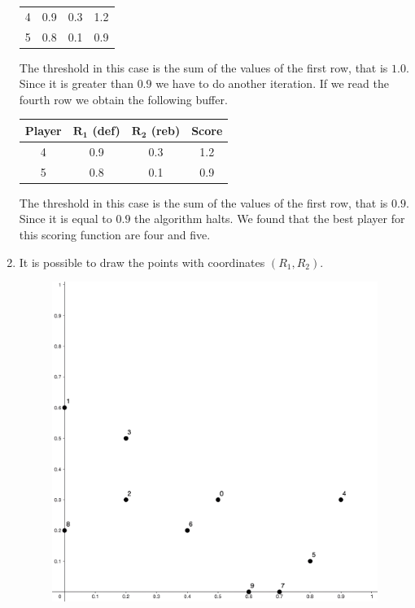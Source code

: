 \documentclass[12pt, a4paper]{report}
\begin{document}
\begin{enumerate}
\begin{table}[H]
\begin{tabular}{c|cc|c}
                4               & 0.9                               & 0.3                               & 1.2            \\
                5               & 0.8                               & 0.1                               & 0.9            \\ \hline
                \end{tabular}
            \end{table}
            The threshold in this case is the sum of the values of the first row, that is $1.0$. Since it is greater than $0.9$ we have to do
            another iteration. If we read the fourth row we obtain the following buffer. 
            \begin{table}[H]
                \centering
                \begin{tabular}{c|cc|c}
                \hline
                \textbf{Player} & \textbf{$\boldsymbol{R_1}$ (def)} & \textbf{$\boldsymbol{R_2}$ (reb)} & \textbf{Score} \\ \hline
                4               & 0.9                               & 0.3                               & 1.2            \\
                5               & 0.8                               & 0.1                               & 0.9            \\ \hline
                \end{tabular}
            \end{table}
            The threshold in this case is the sum of the values of the first row, that is $0.9$. Since it is equal to $0.9$ the algorithm halts. 
            We found that the best player for this scoring function are four and five. 
        \item It is possible to draw the points with coordinates $(R_1,R_2)$. 
            \begin{figure}[H]
                \centering
                \includegraphics[width=0.35\linewidth]{images/skyline.png}
            \end{figure}

\end{enumerate}
\end{document}
